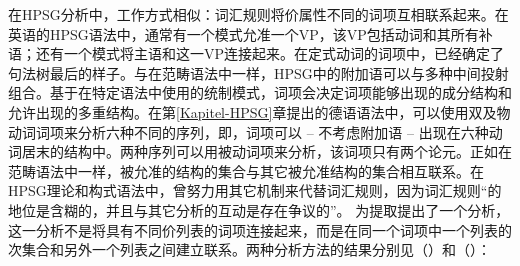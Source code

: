 在HPSG\hpsgc 分析\indexhpsgc 中，工作方式相似：词汇规则将价属性不同的词项互相联系起来。在英语的HPSG语法中，通常有一个模式允准一个VP，该VP包括动词和其所有补语；还有一个模式将主语和这一VP连接起来\citep[]{ps2}。在定式动词的词项中，已经确定了句法树最后的样子。与在范畴语法中一样，HPSG中的附加语可以与多种中间投射组合。基于在特定语法中使用的统制模式，词项会决定词项能够出现的成分结构和允许出现的多重结构。在第\ref{Kapitel-HPSG}章提出的德语语法中，可以使用双及物动词词项来分析六种不同的序列，即，词项可以 -- 不考虑附加语 -- 出现在六种动词居末的结构中。两种序列可以用被动词项来分析，该词项只有两个论元。正如在范畴语法中一样，被允准的结构的集合与其它被允准结构的集合相互联系。在HPSG理论和构式语法中，曾努力用其它机制来代替词汇规则，因为词汇规则“的地位是含糊的，并且与其它分析的互动是存在争议的”\citep*[]{BMS2001a}。 \citet{BMS2001a} 为提取提出了一个分析，这一分析不是将具有不同价列表的词项连接起来，而是在同一个词项中一个列表的次集合和另外一个列表之间建立联系。两种分析方法的结果分别见（）和（）：
